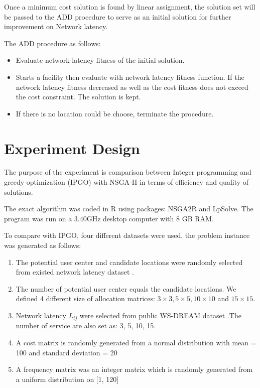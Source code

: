 \documentclass{llncs}
\begin{document}
Once a minimum cost solution is found by linear assignment, the solution set will be passed to the ADD procedure to serve as an initial solution for 
further improvement on Network latency.

 The ADD procedure as follows:
\begin{itemize}
	\item Evaluate network latency fitness of the initial solution.
	\item Starts a facility then evaluate with network latency fitness function. If the network latency fitness decreased as well as 
		the cost fitness does not exceed the cost constraint. The solution is kept.
	\item If there is no location could be choose, terminate the procedure.
\end{itemize}




\section{Experiment Design}
\label{sec:experiment}
The purpose of the experiment is comparison between Integer programming and greedy optimization (IPGO) with NSGA-II in terms of efficiency and quality of solutions. 

The exact algorithm was coded in R \cite{Morandat:2012:EDR:2367163.2367172} using packages: NSGA2R and LpSolve. The program was run on a 3.40GHz 
desktop computer with 8 GB RAM.

To compare with IPGO, four different datasets were used, the problem instance was generated as follows:
\begin{enumerate}
	\item The potential user center and candidate locations were randomly selected from existed network latency dataset \cite{6076756} \cite{5552800}. 
	\item The number of potential user center equals the candidate locations. We defined 4 different size of allocation matrices:
			$3 \times 3, 5 \times 5, 10 \times 10$ and $15 \times 15$.
		\item Network latency $L_{ij}$ were selected from public WS-DREAM dataset  \cite{6076756} \cite{5552800}.The number of service are also set as: 3, 5, 10, 15.
	\item A cost matrix is randomly generated from a normal distribution with mean = 100 and standard deviation = 20
	\item A frequency matrix was an integer matrix which is randomly generated from a uniform distribution on [1, 120]
\end{enumerate}
\end{document}
